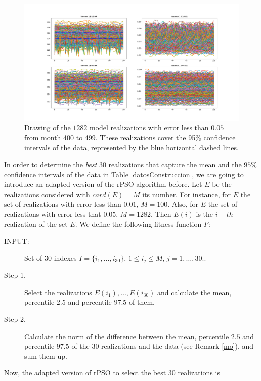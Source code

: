 \begin{figure}[h!]
	\centering
	\includegraphics[width=\linewidth]{IMGs/1.-Calibrado/Error_005.pdf}
	\caption{Drawing of the $1282$ model realizations with error less than $0.05$ from month 400 to 499. These realizations cover the 95\% confidence intervals of the data, represented by the blue horizontal dashed lines.}
	\label{Error_003}
\end{figure}

In order to determine the \textit{best} $30$ realizations that capture the mean and the $95\%$ confidence intervals of the data in Table \ref{datosConstruccion}, we are going to introduce an adapted version of the rPSO algorithm before. Let $E$ be the realizations considered with $card(E)=M$ its number. For instance, for $E$ the set of realizations with error less than $0.01$, $M=100$. Also, for $E$ the set of realizations with error less that $0.05$, $M=1282$. Then $E(i)$ is the $i-th$ realization of the set $E$. We define the following fitness function $F$:

\begin{description}
	\item[INPUT:] Set of $30$ indexes $I=\{i_1,\ldots,i_{30} \}$, $1\leq i_j \leq M$, $j=1,\ldots, 30$..
	\item[Step 1.] Select the realizations $E(i_1),\ldots,E(i_{30})$ and calculate the mean, percentile $2.5$ and percentile $97.5$ of them.
	\item[Step 2.] Calculate the norm of the difference between the mean, percentile $2.5$ and percentile $97.5$  of the $30$ realizations and the data (see Remark \ref{mo}), and sum them up. 
\end{description}

Now, the adapted version of rPSO to select the best $30$ realizations is

